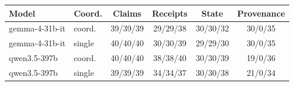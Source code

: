 \begin{tabular}{@{}llcccc@{}}
\toprule
Model & Coord. & Claims & Receipts & State & Provenance \\
\midrule
gemma-4-31b-it & coord. & 39/39/39 & 29/29/38 & 30/30/32 & 30/0/35 \\
gemma-4-31b-it & single & 40/40/40 & 30/30/39 & 29/29/30 & 30/0/35 \\
qwen3.5-397b & coord. & 40/40/40 & 38/38/40 & 30/30/39 & 19/0/36 \\
qwen3.5-397b & single & 39/39/39 & 34/34/37 & 30/30/38 & 21/0/34 \\
\bottomrule
\end{tabular}
